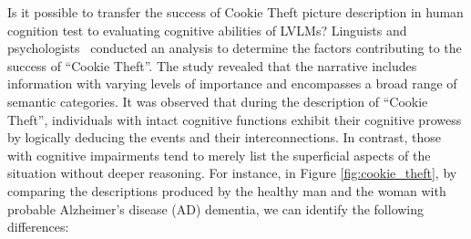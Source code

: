 Is it possible to transfer the success of Cookie Theft picture description in human cognition test to evaluating cognitive abilities of LVLMs? 
Linguists and psychologists~\citep{describe-ctp} conducted an analysis to determine the factors contributing to the success of ``Cookie Theft''. The study revealed that the narrative includes information with varying levels of importance and encompasses a broad range of semantic categories. It was observed that during the description of ``Cookie Theft'', individuals with intact cognitive functions exhibit their cognitive prowess by logically deducing the events and their interconnections. In contrast, those with cognitive impairments tend to merely list the superficial aspects of the situation without deeper reasoning.
For instance, in Figure \ref{fig:cookie_theft}, by comparing the descriptions produced by the healthy man and the woman with probable Alzheimer's disease (AD) dementia, we can identify the following differences:

